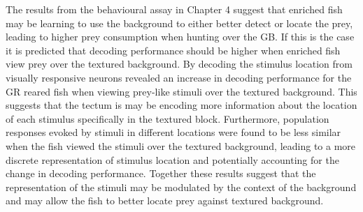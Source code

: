 The results from the behavioural assay in Chapter 4 suggest that enriched fish may be learning to use the background to either better detect or locate the prey, leading to higher prey consumption when hunting over the GB. If this is the case it is predicted that decoding performance should be higher when enriched fish view prey over the textured background. By decoding the stimulus location from visually responsive neurons revealed an increase in decoding performance for the GR reared fish when viewing prey-like stimuli over the textured background. This suggests that the tectum is may be encoding more information about the location of each stimulus specifically in the textured block. Furthermore, population responses evoked by stimuli in different locations were found to be less similar when the fish viewed the stimuli over the textured background, leading to a more discrete representation of stimulus location and potentially accounting for the change in decoding performance. Together these results suggest that the representation of the stimuli may be modulated by the context of the background and may allow the fish to better locate prey against textured background.

